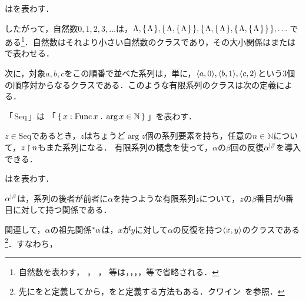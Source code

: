 \begin{df}
\label{df:自然数}
はを表わす．
\end{df}
\noindent したがって，自然数$ 0,1,2,3,\dots $は，$ \Lambda,\{\mspace{2mu}\Lambda\mspace{2mu}\},\{\mspace{2mu}\Lambda,\{\mspace{2mu}\Lambda\mspace{2mu}\}\mspace{2mu}\},\{\mspace{2mu}\Lambda,\{\mspace{2mu}\Lambda\mspace{2mu}\},\{\mspace{2mu}\Lambda,\{\mspace{2mu}\Lambda\mspace{2mu}\}\mspace{2mu}\}\mspace{2mu}\},\dots $である\footnote{
    自然数を表わす\kagi{$\Lambda$}，
    ，
    ，
    等は，，，，等で省略される．
}．自然数はそれより小さい自然数のクラスであり，その大小関係は\kagi{$\in$}または\kagi{$ \subset $}で表わせる．

次に，対象$ a,b,c $をこの順番で並べた系列は，単に，$ \langle a,0 \rangle,\langle b,1 \rangle,\langle c,2 \rangle $という$ 3 $個の順序対からなるクラスである．このような有限系列のクラスは次の定義による．
\begin{df}
    「\,$ \mathrm{Seq} $\,」は
    「\,$ \{\,x:
        \func x \con{1} \arg x\in \mathbb{N}
    \,\} $\,」を表わす．
    \label{df:有限系列}
\end{df}
\noindent$ z\in\mathrm{Seq} $であるとき，$ z $はちょうど$ \arg z $個の系列要素を持ち，任意の$ n\in \mathbb{N} $について，$z\mathbin{\upharpoonright} n$もまた系列になる．
有限系列の概念を使って，$\alpha$の$\beta$回の反復$\iter{\alpha}{\beta}$を導入できる．

\begin{df}
\label{df:関係の反復}
\kagi{$
    \iter{\alpha}{\beta}
$}はを表わす．
\end{df}
\noindent$\iter{\alpha}{\beta}$は，系列の後者が前者に$\alpha$を持つような有限系列$z$について，$z$の$\beta$番目が$0$番目に対して持つ関係である．

関連して，$\alpha$の祖先関係$\ance{\alpha}$は，$x$が$y$に対して$\alpha$の反復を持つ$\langle x,y \rangle$のクラスである\footnote{
    先に\kagi{$ \ance{\alpha} $}をと定義してから，をと定義する方法もある．クワイン~\cite[pp.\,93--95]{クワインa}を参照．
}．すなわち，

